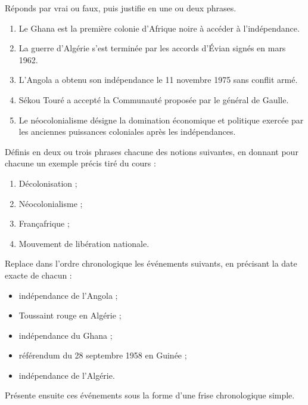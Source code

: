 \documentclass[11pt]{article}
\newcommand{\cle}[1]{{\popxbold\color{popdark}#1}}
\newcounter{popsec}
\newcounter{popsub}
\newcommand{\courssub}[1]{%
  \stepcounter{popsub}%
  \par\vspace{9pt}\noindent{\popxbold\fontsize{11.5}{13}\selectfont\color{popink}{\color{poporange}\thepopsec.\thepopsub}\hspace{6pt}#1}\par\nopagebreak\vspace{4pt}
}
\begin{document}
\begin{exercice}
Réponds par vrai ou faux, puis justifie en une ou deux phrases.
\begin{enumerate}
\item Le Ghana est la première colonie d'Afrique noire à accéder à l'indépendance.
\item La guerre d'Algérie s'est terminée par les accords d'Évian signés en mars 1962.
\item L'Angola a obtenu son indépendance le 11 novembre 1975 sans conflit armé.
\item Sékou Touré a accepté la Communauté proposée par le général de Gaulle.
\item Le néocolonialisme désigne la domination économique et politique exercée par les anciennes puissances coloniales après les indépendances.
\end{enumerate}
\end{exercice}

\begin{exercice}[Définitions]
Définis en deux ou trois phrases chacune des notions suivantes, en donnant pour chacune un exemple précis tiré du cours :
\begin{enumerate}
\item \cle{Décolonisation} ;
\item \cle{Néocolonialisme} ;
\item \cle{Françafrique} ;
\item \cle{Mouvement de libération nationale}.
\end{enumerate}
\end{exercice}

\begin{exercice}
Replace dans l'ordre chronologique les événements suivants, en précisant la date exacte de chacun :
\begin{itemize}
\item indépendance de l'Angola ;
\item Toussaint rouge en Algérie ;
\item indépendance du Ghana ;
\item référendum du 28 septembre 1958 en Guinée ;
\item indépendance de l'Algérie.
\end{itemize}
Présente ensuite ces événements sous la forme d'une frise chronologique simple.
\end{exercice}

\courssub{Je m'entraîne}
\end{document}
